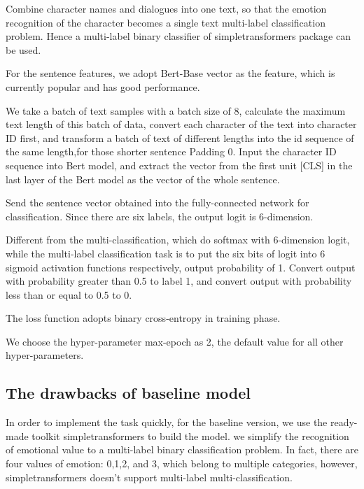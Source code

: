 \documentclass[12pt,twocolumn,letterpaper]{article}
\begin{document}
 Combine character names and dialogues into one text, so that the emotion recognition of the character becomes a single text multi-label classification problem. Hence a multi-label binary classifier of simpletransformers package can be used.

 For the sentence features, we adopt Bert-Base vector as the feature,  which is currently popular and has good performance.  

 We take a batch of text samples with a batch size of 8, calculate the maximum text length of this batch of data, convert each character of the text into character ID first, and transform a batch of text of different lengths into the id sequence of the same length,for those shorter sentence Padding 0.
 Input the character ID sequence into Bert model, and extract the vector from the first unit [CLS] in the last layer of the Bert model as the vector of the whole sentence.  

 Send the sentence vector obtained into the fully-connected network for classification. Since there are six labels, the output logit is 6-dimension.  

 Different from the multi-classification, which do softmax with 6-dimension logit, while the multi-label classification task is to put the six bits of logit into 6 sigmoid activation functions respectively, output probability of 1.  
 Convert output with probability greater than 0.5 to label 1, and convert output with probability less than or equal to 0.5 to 0. 

The loss function adopts binary cross-entropy in training phase.

We choose the hyper-parameter max-epoch as 2, the default value for all other hyper-parameters. 

\subsection{The drawbacks of baseline model}
In order to implement the task quickly, for the baseline version, we use the ready-made toolkit simpletransformers to build the model. we  simplify the recognition of emotional value to a multi-label binary classification problem. In fact, there are four values of emotion: 0,1,2, and 3, which belong to multiple categories, however, simpletransformers doesn't support multi-label multi-classification.
\end{document}
